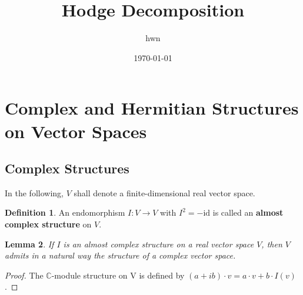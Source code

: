 \documentclass{article}
\title{\textbf{Hodge Decomposition}}
\author{hwn}
\date{\today}
\theoremstyle{definition}
\newtheorem{definition}{Definition}[subsection]
\theoremstyle{plain}
\newtheorem{lemma}[definition]{Lemma}
\begin{document}
\maketitle
{}
\tableofcontents




\section{Complex and Hermitian Structures on Vector Spaces}


\subsection{Complex Structures}

In the following, $ V $ shall denote a finite-dimensional real vector space.

\begin{definition}
    An endomorphism $ I:V\rightarrow V $ with $ I^2=-\mathrm{id} $ is called an \textbf{almost complex structure} on $ V $.
\end{definition}

\begin{lemma}\label{hh}
    If $ I $ is an almost complex structure on a real vector space $ V $, then $ V $ admits in a natural way the structure of a complex vector space. 
\end{lemma}

\begin{proof}
    The $ \mathbb{C} $-module structure on V is defined by $ (a+ib)\cdot v=a\cdot v+b\cdot I(v) $.
\end{proof}
\end{document}
